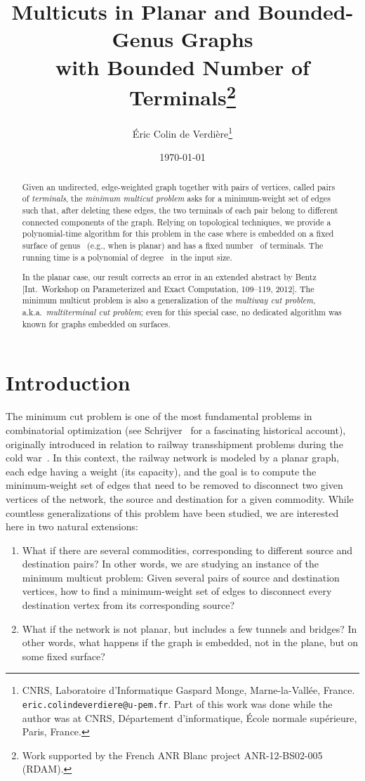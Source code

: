 \documentclass[11pt]{article}
\title{Multicuts in Planar and Bounded-Genus Graphs\\ with Bounded Number of
  Terminals\thanks{Work supported by the French ANR Blanc project
    ANR-12-BS02-005 (RDAM).}}
\author{\'Eric Colin de Verdi\`ere\thanks{CNRS, Laboratoire d'Informatique
    Gaspard Monge, Marne-la-Vall\'ee, France.
    \texttt{eric.colindeverdiere}\texttt{@u-pem.fr}.  Part of this work was
    done while the author was at CNRS, D\'epartement d'informatique,
    \'Ecole normale sup\'erieure, Paris, France.}}
\date{\today}
\theoremstyle{plain}  \newtheorem{theorem}{Theorem}[section]
\theoremstyle{definition}
\begin{document}
\maketitle

\begin{abstract}
  Given an undirected, edge-weighted graph  together with pairs of
  vertices, called pairs of \emph{terminals}, the \emph{minimum multicut
    problem} asks for a minimum-weight set of edges such that, after
  deleting these edges, the two terminals of each pair belong to different
  connected components of the graph.  Relying on topological techniques, we
  provide a polynomial-time algorithm for this problem in the case where
   is embedded on a fixed surface of genus~ (e.g., when  is
  planar) and has a fixed number~ of terminals.  The running time is a
  polynomial of degree~ in the input size.

  In the planar case, our result corrects an error in an extended abstract
  by Bentz [Int.\ Workshop on Parameterized and Exact Computation,
  109--119, 2012].  The minimum multicut problem is also a generalization
  of the \emph{multiway cut problem}, a.k.a.\ \emph{multiterminal cut
    problem}; even for this special case, no dedicated algorithm was known
  for graphs embedded on surfaces.
\end{abstract}

\section{Introduction}\label{S:intro}

The minimum cut problem is one of the most fundamental problems in
combinatorial optimization (see Schrijver~\cite{s-hcot-05} for a
fascinating historical account), originally introduced in relation to
railway transshipment problems during the cold war~\cite{hr-fmern-55}.  In
this context, the railway network is modeled by a planar graph, each edge
having a weight (its capacity), and the goal is to compute the
minimum-weight set of edges that need to be removed to disconnect two given
vertices of the network, the source and destination for a given commodity.
While countless generalizations of this problem have been studied, we are
interested here in two natural extensions:
\begin{enumerate}
\item What if there are several commodities, corresponding to different
  source and destination pairs?  In other words, we are studying an instance
  of the minimum multicut problem: Given several pairs of source and
  destination vertices, how to find a minimum-weight set of edges to
  disconnect every destination vertex from its corresponding source?
\item What if the network is not planar, but includes a few tunnels and
  bridges?  In other words, what happens if the graph is embedded, not in
  the plane, but on some fixed surface?
\end{enumerate}
\end{document}
